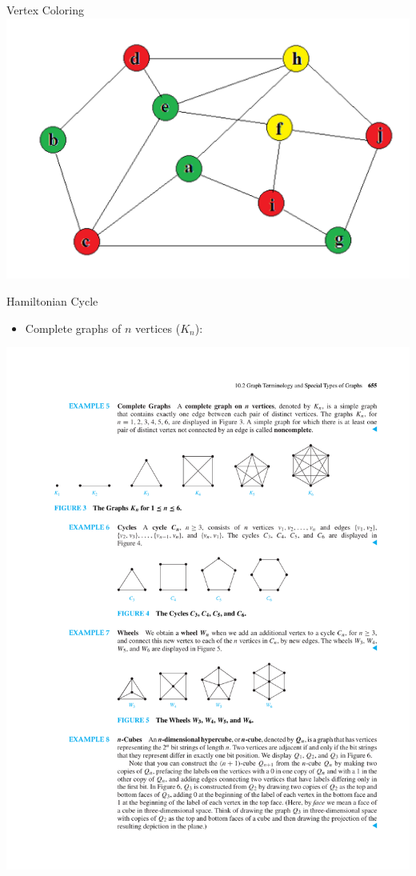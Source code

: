 \documentclass{beamer}
\theoremstyle{definition}
\begin{document}
\begin{frame}{Vertex Coloring}
    \centering \includegraphics[width=.7\linewidth]{p3.PNG}
\end{frame}

\begin{frame}{Hamiltonian Cycle}
   \begin{itemize}
        \item Complete graphs of $n$ vertices ($K_n$):
    \end{itemize}
    \centering \includegraphics[trim={2cm 20cm 7cm 5cm},clip,width=.9\linewidth]{p655}
\end{frame}
\end{document}
